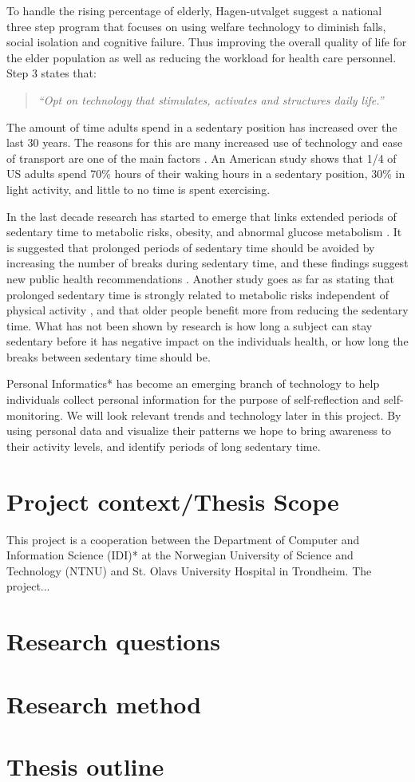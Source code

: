 To handle the rising percentage of elderly, Hagen-utvalget suggest a national three step program that focuses on using welfare technology to diminish falls, social isolation and cognitive failure. Thus improving the overall quality of life for the elder population as well as reducing the workload for health care personnel. 
Step 3 states that:
\begin{quote}
\textit{``Opt on technology that stimulates, activates and structures daily life.''}
\end{quote}

The amount of time adults spend in a sedentary position has increased over the last 30 years. The reasons for this are many increased use of technology and ease of transport are one of the main factors \cite{sedentaryBehaviour}. An American study shows that 1/4 of US adults spend 70\% hours of their waking hours in a sedentary position, 30\% in light activity, and little to no time is spent exercising.

In the last decade research has started to emerge that links extended periods of sedentary time to metabolic risks\cite{sedentaryTime}, obesity, and abnormal glucose metabolism \cite{breaksSedentary}. It is suggested that prolonged periods of sedentary time should be avoided by increasing the number of breaks during sedentary time, and these findings suggest new public health recommendations \cite{breaksSedentary}. Another study goes as far as stating that prolonged sedentary time is strongly related to metabolic risks independent of physical activity \cite{sedentaryActivity}, and that older people benefit more from reducing the sedentary time. What has not been shown by research is how long a subject can stay sedentary before it has negative impact on the individuals health, or how long the breaks between sedentary time should be.

Personal Informatics* has become an emerging branch of technology to help individuals collect personal information for the purpose of self-reflection and self-monitoring. We will look relevant trends and technology later in this project. By using personal data and visualize their patterns we hope to bring awareness to their activity levels, and identify periods of long sedentary time. 

\section{Project context/Thesis Scope}
This project is a cooperation between the Department of Computer and Information Science (IDI)* at the Norwegian University of Science and Technology (NTNU) and St. Olavs University Hospital in Trondheim. The project...

\section{Research questions}



\section{Research method}

\section{Thesis outline}
